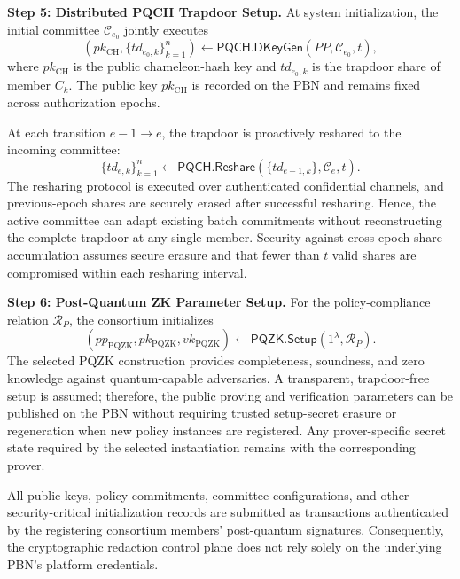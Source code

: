 \documentclass[lettersize,journal]{IEEEtran}
\begin{document}
\textbf{Step 5: Distributed PQCH Trapdoor Setup.}
At system initialization, the initial committee
$\mathcal{C}_{e_0}$ jointly executes
\begin{equation}
(pk_{\mathrm{CH}},\{td_{e_0,k}\}_{k=1}^{n})
\leftarrow
\mathsf{PQCH.DKeyGen}(PP,\mathcal{C}_{e_0},t),
\end{equation}
where $pk_{\mathrm{CH}}$ is the public chameleon-hash key and
$td_{e_0,k}$ is the trapdoor share of member $C_k$.
The public key $pk_{\mathrm{CH}}$ is recorded on the PBN and remains
fixed across authorization epochs.

At each transition $e-1\rightarrow e$, the trapdoor is proactively
reshared to the incoming committee:
\begin{equation}
\{td_{e,k}\}_{k=1}^{n}
\leftarrow
\mathsf{PQCH.Reshare}
(\{td_{e-1,k}\},\mathcal{C}_e,t).
\end{equation}
The resharing protocol is executed over authenticated confidential
channels, and previous-epoch shares are securely erased after successful
resharing. Hence, the active committee can adapt existing batch
commitments without reconstructing the complete trapdoor at any single
member. Security against cross-epoch share accumulation assumes secure
erasure and that fewer than $t$ valid shares are compromised within
each resharing interval.

\textbf{Step 6: Post-Quantum ZK Parameter Setup.}
For the policy-compliance relation $\mathcal{R}_P$, the consortium
initializes
\begin{equation}
(pp_{\mathrm{PQZK}},pk_{\mathrm{PQZK}},vk_{\mathrm{PQZK}})
\leftarrow
\mathsf{PQZK.Setup}(1^\lambda,\mathcal{R}_P).
\end{equation}
The selected PQZK construction provides completeness, soundness, and
zero knowledge against quantum-capable adversaries. A transparent,
trapdoor-free setup is assumed; therefore, the public proving and
verification parameters can be published on the PBN without requiring
trusted setup-secret erasure or regeneration when new policy instances
are registered. Any prover-specific secret state required by the
selected instantiation remains with the corresponding prover.

All public keys, policy commitments, committee configurations, and
other security-critical initialization records are submitted as
transactions authenticated by the registering consortium members'
post-quantum signatures. Consequently, the cryptographic redaction
control plane does not rely solely on the underlying PBN's platform
credentials.
    
\end{document}

